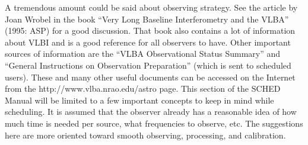 \documentclass{report}
\newcommand{\schedb}{{\sc SCHED~}}
\begin{document}
A tremendous amount could be said about observing strategy.  See the
article by Joan Wrobel in the book ``Very Long Baseline Interferometry
and the VLBA'' (1995: ASP) for a good discussion.  That book also
contains a lot of information about VLBI and is a good reference for
all observers to have.  Other important sources of information are the
``VLBA Observational Status Summary'' and ``General Instructions on
Observation Preparation'' (which is sent to scheduled users).  These
and many other useful documents can be accessed on the Internet from
the 
{http://www.vlba.nrao.edu/astro} page.  This section of the \schedb
Manual will be limited to a few important concepts to keep in mind
while scheduling.  It is assumed that the observer already has a
reasonable idea of how much time is needed per source, what
frequencies to observe, etc.  The suggestions here are more oriented
toward smooth observing, processing, and calibration.
\end{document}

